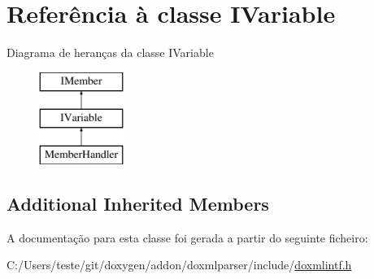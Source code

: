 \hypertarget{class_i_variable}{\section{Referência à classe I\-Variable}
\label{class_i_variable}
}
Diagrama de heranças da classe I\-Variable\begin{figure}[H]
\begin{center}
\leavevmode
\includegraphics[height=3.000000cm]{class_i_variable}
\end{center}
\end{figure}
\subsection*{Additional Inherited Members}


A documentação para esta classe foi gerada a partir do seguinte ficheiro\-:\begin{DoxyCompactItemize}
\item 
C\-:/\-Users/teste/git/doxygen/addon/doxmlparser/include/\hyperlink{include_2doxmlintf_8h}{doxmlintf.\-h}\end{DoxyCompactItemize}
